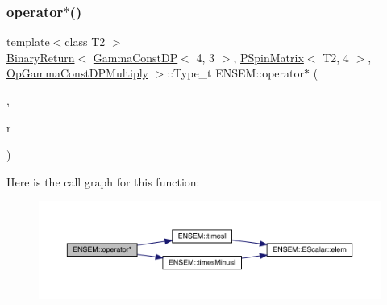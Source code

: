 \subsubsection{\texorpdfstring{operator$\ast$()}{operator*()}\hspace{0.1cm}{\footnotesize\ttfamily [36/64]}}
{\footnotesize\ttfamily template$<$class T2 $>$ \\
\mbox{\hyperlink{structENSEM_1_1BinaryReturn}{Binary\+Return}}$<$ \mbox{\hyperlink{classENSEM_1_1GammaConstDP}{Gamma\+Const\+DP}}$<$ 4, 3 $>$, \mbox{\hyperlink{classENSEM_1_1PSpinMatrix}{P\+Spin\+Matrix}}$<$ T2, 4 $>$, \mbox{\hyperlink{structENSEM_1_1OpGammaConstDPMultiply}{Op\+Gamma\+Const\+D\+P\+Multiply}} $>$\+::Type\+\_\+t E\+N\+S\+E\+M\+::operator$\ast$ (\begin{DoxyParamCaption}\item[{const \mbox{\hyperlink{classENSEM_1_1GammaConstDP}{Gamma\+Const\+DP}}$<$ 4, 3 $>$ \&}]{,  }\item[{const \mbox{\hyperlink{classENSEM_1_1PSpinMatrix}{P\+Spin\+Matrix}}$<$ T2, 4 $>$ \&}]{r }\end{DoxyParamCaption})\hspace{0.3cm}{\ttfamily [inline]}}

Here is the call graph for this function\+:\nopagebreak
\begin{figure}[H]
\begin{center}
\leavevmode
\includegraphics[width=350pt]{d6/df5/group__primspinmatrix_gae21434001730b61b41c47db91f4a45ba_cgraph}
\end{center}
\end{figure}
\mbox{\label{group__primspinmatrix_ga5399e919ac66849bae0231bd88b07167}} 
